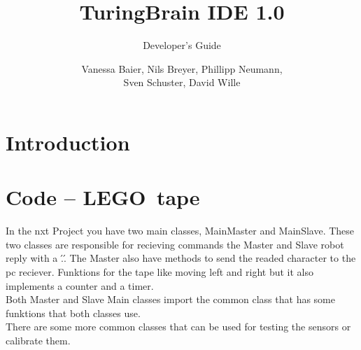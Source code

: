 \documentclass[%
  a4paper,%
  11pt,%
  blue,%
  hyperref	%
  ]{tubsartcl}
\title{TuringBrain IDE \LARGE 1.0}
\subtitle{Developer's Guide}
\author{\small Vanessa Baier, Nils Breyer, Phillipp Neumann,\\ Sven Schuster, David Wille}
\begin{document}
\maketitle[image,logo=right]%

\tableofcontents
\newpage
\section{Introduction}

\section{Code -- LEGO\textregistered\, tape}

In the nxt Project you have two main classes, MainMaster and MainSlave. These two classes are responsible for recieving commands the Master and Slave robot reply with a \'.\'. The Master also have methods to send the readed character to the pc reciever. Funktions for the tape like moving left and right but it also implements a counter and a timer. \\
Both Master and Slave Main classes import the common class that has some funktions that both classes use.\\
There are some more common classes that can be used for testing the sensors or calibrate them.






\end{document}

